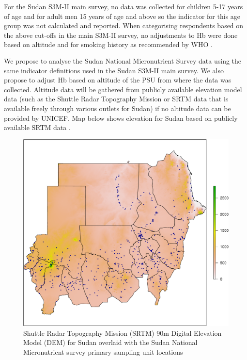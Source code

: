 \documentclass[12pt,a4paper]{article}
\begin{document}
For the Sudan S3M-II main survey, no data was collected for children 5-17 years of age and for adult men 15 years of age and above so the indicator for this age group was not calculated and reported. When categorising respondents based on the above cut-offs in the main S3M-II survey, no adjustments to Hb were done based on altitude and for smoking history as recommended by WHO \citep{WorldHealthOrganization:2007tx, WorldHealthOrganization:2011ut}.

We propose to analyse the Sudan National Micronutrient Survey data using the same indicator definitions used in the Sudan S3M-II main survey. We also propose to adjust Hb based on altitude of the PSU from where the data was collected. Altitude data will be gathered from publicly available elevation model data (such as the Shuttle Radar Topography Mission or SRTM data that is available freely through various outlets for Sudan) if no altitude data can be provided by UNICEF. Map below shows elevation for Sudan based on publicly available SRTM data \citep{cgiar:2020}.

\begin{figure}[H]

{\centering \includegraphics{sudanMNindicators_files/figure-latex/elevation1-1} 

}

\caption{Shuttle Radar Topography Mission (SRTM) 90m Digital Elevation Model (DEM) for Sudan overlaid with the Sudan National Micronutrient survey primary sampling unit locations}\label{fig:elevation1}
\end{figure}
\end{document}
